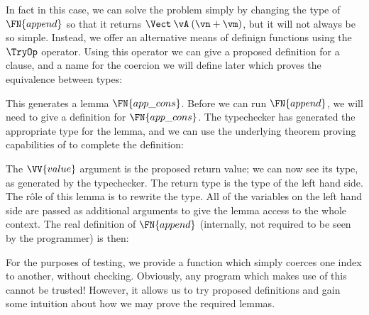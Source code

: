 In fact in this case, we can solve the problem simply by changing the type of
$\FN{append}$ so that it returns $\Vect\:\vA\:(\vn+\vm)$, but it will
not always be so simple.
Instead, we offer an alternative means of definign functions using the
$\TryOp$ operator. Using this operator we can give a proposed
definition for a clause, and a name for the coercion we will define
later which proves the equivalence between types:


This generates a lemma $\FN{app\_cons}$. Before we can run
$\FN{append}$, we will need to give a definition for $\FN{app\_cons}$.
The typechecker has generated the appropriate type for the lemma,
and we can use the underlying theorem proving capabilities of \Ivor{}
to complete the definition:


\noindent
The $\VV{value}$ argument is the proposed return value; we can now see
its type, as generated by the typechecker. The return type is the
type of the left hand side. The r\^{o}le of this lemma is to rewrite
the type. All of the variables on the left hand side are passed as
additional arguments to give the lemma access to the whole context.
The real definition of $\FN{append}$ (internally, not required to be
seen by the programmer) is then:


For the purposes of testing, we provide a function which simply coerces
one index to another, without checking. Obviously, any program which
makes use of this cannot be trusted! However, it allows us to try
proposed definitions and gain some intuition about how we may prove
the required lemmas.

